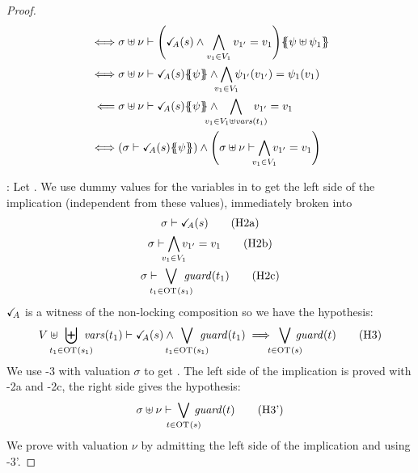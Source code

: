 \documentclass{article}
\begin{document}
\begin{proof}
\begin{align*}
		\iff & \sigma \uplus \nu \vdash \mpar{\reach{A}\mpar{s} \wedge \bigwedge_{v_1 \in V_1} v_{1'} = v_1}\psubst{\psi \uplus \psi_1} \\
		\iff & \sigma \uplus \nu \vdash \reach{A}\mpar{s}\psubst{\psi} \wedge \bigwedge_\subbox{v_1 \in V_1} \psi_{1'}\mpar{v_{1'}} = \psi_1\mpar{v_1} \\
		\impliedby & \sigma \uplus \nu \vdash \reach{A}\mpar{s}\psubst{\psi} \wedge \bigwedge_\subbox{v_1 \in V_1 \uplus \fvars{t_1}} v_{1'} = v_1 \\
		\iff & \mpar{\sigma \vdash \reach{A}\mpar{s}\psubst{\psi}} \wedge \mpar{\sigma \uplus \nu \vdash \bigwedge_\subbox{v_1 \in V_1} v_{1'} = v_1}
	\end{align*}
\item[\goal{1}:] Let .
	We use dummy values for the variables in  to get the left side of the implication (independent from these values), immediately broken into
	\begin{gather}
		\sigma \vdash \reach{A}\mpar{s} \hyp{2a} \\
		\sigma \vdash \bigwedge_\subbox{v_1 \in V_1} v_{1'} = v_1 \hyp{2b} \\
		\sigma \vdash \bigvee_\subbox{t_1 \in \fOT{s_1}} \fguard{t_1} \hyp{2c}
	\end{gather}
	\(\checkmark_{\!\! A}\) is a witness of the non-locking composition so we have the hypothesis:
	\[ V \uplus \biguplus_\subbox{t_1 \in \fOT{s_1}} \fvars{t_1} \vdash \reach{A}\mpar{s} \wedge \bigvee_\subbox{t_1 \in \fOT{s_1}} \fguard{t_1} \implies \bigvee_\subbox{t \in \fOT{s}} \fguard{t} \hyp{3} \]
	We use \hyp{3} with valuation \(\sigma\) to get .
	The left side of the implication is proved with \hyp{2a} and \hyp{2c}, the right side gives the hypothesis:
	\[ \sigma \uplus \nu \vdash \bigvee_\subbox{t \in \fOT{s}} \fguard{t} \hyp{3'} \]
	We prove  with valuation \(\nu\) by admitting the left side of the implication and using \hyp{3'}.
\end{proof}
\end{document}
